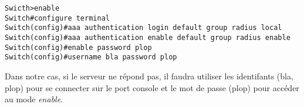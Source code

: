 \begin{verbatim}
Swicth>enable
Switch#configure terminal
Switch(config)#aaa authentication login default group radius local
Switch(config)#aaa authentication enable default group radius enable
Switch(config)#enable password plop
Switch(config)#username bla password plop
\end{verbatim}

Dans notre cas, si le serveur ne répond pas, il faudra utiliser les identifants (bla, plop) pour se connecter sur le port console et le mot de passe (plop) pour accéder au mode \textit{enable}.
